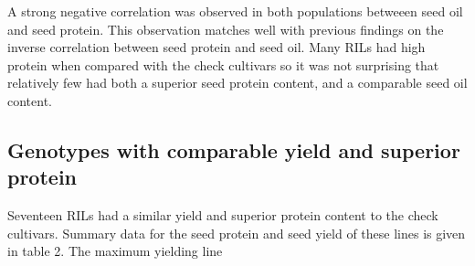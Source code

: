 \documentclass[Agronomy,article,submit,moreauthors,pdftex]{mdpi}
\begin{document}
A strong negative correlation was observed in both populations betweeen
seed oil and seed protein. This observation matches well with previous
findings on the inverse correlation between seed protein and seed oil.
Many RILs had high protein when compared with the check cultivars so it
was not surprising that relatively few had both a superior seed protein
content, and a comparable seed oil content.

\hypertarget{genotypes-with-comparable-yield-and-superior-protein}{%
\subsection{Genotypes with comparable yield and superior
protein}\label{genotypes-with-comparable-yield-and-superior-protein}}

Seventeen RILs had a similar yield and superior protein content to the
check cultivars. Summary data for the seed protein and seed yield of
these lines is given in table 2. The maximum yielding line
\end{document}
